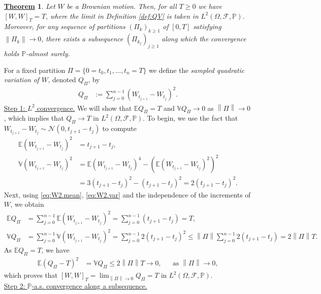 \documentclass[12pt]{book}
\numberwithin{equation}{chapter}
\theoremstyle{plain}
\newtheorem{theorem}{\underline{Theorem}}
\numberwithin{theorem}{section}
\theoremstyle{definition}
\numberwithin{exercise}{chapter}
\let\oldendproof\endproof
\renewenvironment{proof}[1][\proofname]{%
  \oldproof[\scshape\underline{#1}]%
}{\oldendproof}
\newcommand{\<}{\langle}
\renewcommand{\>}{\rangle}
\renewcommand{\(}{\left(}
\renewcommand{\)}{\right)}
\renewcommand{\[}{\left[}
\renewcommand{\]}{\right]}
\newcommand\Eb{\mathds{E}}
\newcommand\Pb{\mathds{P}}
\newcommand\Vb{\mathds{V}}
\newcommand\Fc{\mathscr{F}}
\newcommand\Nc{\mathscr{N}}
\newcommand\Om{\Omega}
\newcommand{\norm}[1]{\left\|#1\right\|}
\begin{document}
\begin{theorem}
\label{thm:bm.QV}
Let $W$ be a Brownian motion.  Then, for all $T \geq 0$ we have $[W,W]_T = T$, where the limit in Definition \ref{def:QV} is taken in $L^2(\Om,\Fc,\Pb)$.  Moreover, for any sequence of partitions $(\Pi_k)_{k \geq 1}$ of $[0,T]$ satisfying $\norm{\Pi_k} \to 0$, there exists a subsequence $(\Pi_{k_j})_{j \geq 1}$ along which the convergence holds $\Pb$-almost surely.
\end{theorem}

\begin{proof}
For a fixed partition $\Pi = \{ 0 = t_0, t_1, \ldots, t_n = T \}$ we define the \emph{sampled quadratic variation of $W$}, denoted $Q_\Pi$, by
\begin{align}
Q_\Pi
	&:=	\sum_{j=0}^{n-1} (W_{t_{j+1}} - W_{t_j})^2 .
\end{align}
\underline{Step 1: $L^2$ convergence.}
We will show that $\Eb Q_\Pi = T$ and $\Vb Q_\Pi \to 0$ as $\norm{\Pi} \to 0$, which implies that $Q_\Pi \to T$ in $L^2(\Om,\Fc,\Pb)$.
To begin, we use the fact that $W_{t_{j+1}} - W_{t_j} \sim \Nc(0,t_{j+1}-t_j)$ to compute
\begin{align}
\Eb (W_{t_{j+1}} - W_{t_j})^2
	&=	t_{j+1} - t_j , \label{eq:W2.mean} \\
\Vb (W_{t_{j+1}} - W_{t_j})^2
	&=	\Eb (W_{t_{j+1}} - W_{t_j})^4 - \( \Eb (W_{t_{j+1}} - W_{t_j})^2 \)^2 \\
	&=	3 ( t_{j+1} - t_j )^2 - (t_{j+1} - t_j )^2 
	=		2 ( t_{j+1} - t_j )^2 . \label{eq:W2.var}
\end{align}
Next, using \eqref{eq:W2.mean}, \eqref{eq:W2.var} and the independence of the increments of $W$, we obtain
\begin{align}
\Eb Q_\Pi
	&=	\sum_{j=0}^{n-1} \Eb (W_{t_{j+1}} - W_{t_j})^2 
	=		\sum_{j=0}^{n-1}  ( t_{j+1} - t_j ) 
	=		T , \\
\Vb Q_\Pi
	&=	\sum_{j=0}^{n-1} \Vb (W_{t_{j+1}} - W_{t_j})^2 
	=		\sum_{j=0}^{n-1}2 ( t_{j+1} - t_j )^2
	\leq \norm{\Pi} \sum_{j=0}^{n-1}2 ( t_{j+1} - t_j )
	=		2 \norm{\Pi} T .
\end{align}
As $\Eb Q_\Pi = T$, we have
\begin{align}
\Eb ( Q_\Pi - T )^2
	&=	\Vb Q_\Pi 
	\leq	2 \norm{\Pi} T 
	\to		0 , &
	&\text{as $\norm{\Pi} \to 0$} , \label{eq:QV.L2.bound}
\end{align}
which proves that $[W,W]_T = \lim_{\norm{\Pi}\to 0} Q_{\Pi} = T$ in $L^2(\Om,\Fc,\Pb)$.
\\[0.5em]
\underline{Step 2: $\Pb$-a.s. convergence along a subsequence.}

\end{proof}
\end{document}
